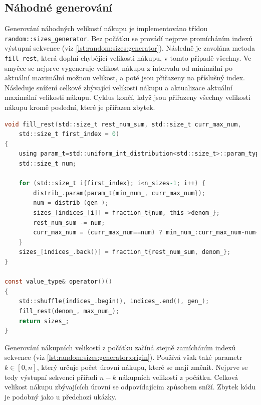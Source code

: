 \subsection{Náhodné generování}
Generování náhodných velikostí nákupu je implementováno třídou \texttt{random::sizes\_generator}.
Bez počátku se provádí nejprve promícháním indexů výstupní sekvence (viz \ref{lst:random:sizes:generator}).
Následně je zavolána metoda \texttt{fill\_rest}, která doplní chybějící velikosti nákupu, v tomto případě všechny.
Ve smyčce se nejprve vygeneruje velikost nákupu z intervalu od minimální po aktuální maximální možnou velikost, a poté jsou přiřazeny na příslušný index.
Následuje snížení celkové zbývající velikosti nákupu a aktualizace aktuální maximální velikosti nákupu.
Cyklus končí, když jsou přiřazeny všechny velikosti nákupu kromě poslední, které je přiřazen zbytek.

\begin{lstlisting}[caption={~Metody pro náhodné generování velikostí nákupu bez počátku},label={lst:random:sizes:generator},captionpos=t,abovecaptionskip=-\medskipamount,belowcaptionskip=\medskipamount,language=C]
void fill_rest(std::size_t rest_num_sum, std::size_t curr_max_num,
    std::size_t first_index = 0)
{
    using param_t=std::uniform_int_distribution<std::size_t>::param_type;
    std::size_t num;
    
    for (std::size_t i{first_index}; i<n_sizes-1; i++) {
        distrib_.param(param_t{min_num_, curr_max_num});
        num = distrib_(gen_);
        sizes_[indices_[i]] = fraction_t{num, this->denom_};
        rest_num_sum -= num;
        curr_max_num = (curr_max_num==num) ? min_num_:curr_max_num-num+1;
    }
    sizes_[indices_.back()] = fraction_t{rest_num_sum, denom_};
}

const value_type& operator()()
{
    std::shuffle(indices_.begin(), indices_.end(), gen_);
    fill_rest(denom_, max_num_);
    return sizes_;
}
\end{lstlisting}

Generování nákupních velikostí z počátku začíná stejně zamícháním indexů sekvence (viz \ref{lst:random:sizes:generator:origin}).
Používá však také parametr $k\in[0, n]$, který určuje počet úrovní nákupu, které se mají změnit.
Nejprve se tedy výstupní sekvenci přiřadí $n-k$ nákupních velikostí z počátku.
Celková velikost nákupu zbývajících úrovní se odpovídajícím způsobem sníží.
Zbytek kódu je podobný jako u předchozí ukázky.

